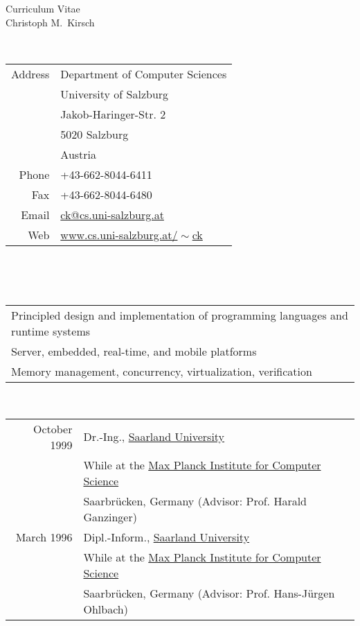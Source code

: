 \thispagestyle{empty}

\begin{center}
  {\sc \Huge Curriculum Vitae}\\ \vspace{10mm}
  {\sc \Large Christoph M.~Kirsch}\\ \vspace{12mm}
\end{center} \vfill

 \\
\begin{tabular}{rl}
Address & Department of Computer Sciences\\
        & University of Salzburg\\
        & Jakob-Haringer-Str. 2\\
        & 5020 Salzburg\\
        & Austria\\
\noalign{\smallskip}
Phone   & +43-662-8044-6411\\
Fax     & +43-662-8044-6480\\
Email   & \href{mailto:ck@cs.uni-salzburg.at}{ck@cs.uni-salzburg.at} \\
Web     & \href{http://www.cs.uni-salzburg.at/~ck}{www.cs.uni-salzburg.at/$\!\sim$ck} \\
\end{tabular} \\ \vfill

 \\
\begin{tabular}{l}
Principled design and implementation of programming languages and runtime systems \\
\noalign{\smallskip}
Server, embedded, real-time, and mobile platforms \\
\noalign{\smallskip}
Memory management, concurrency, virtualization, verification
\end{tabular} \vfill

 \\
\begin{tabular}{rl}
October 1999 & Dr.-Ing., \href{http://www.uni-saarland.de}{Saarland University} \\
             & While at the \href{http://www.mpi-sb.mpg.de}{Max Planck Institute for Computer Science} \\
             & Saarbr{\"u}cken, Germany (Advisor: Prof. Harald Ganzinger)\\
\noalign{\smallskip}
March 1996 & Dipl.-Inform., \href{http://www.uni-saarland.de}{Saarland University} \\
           & While at the \href{http://www.mpi-sb.mpg.de}{Max Planck Institute for Computer Science} \\
           & Saarbr{\"u}cken, Germany (Advisor: Prof. Hans-J{\"u}rgen Ohlbach)\\
\end{tabular} \\ \vfill

